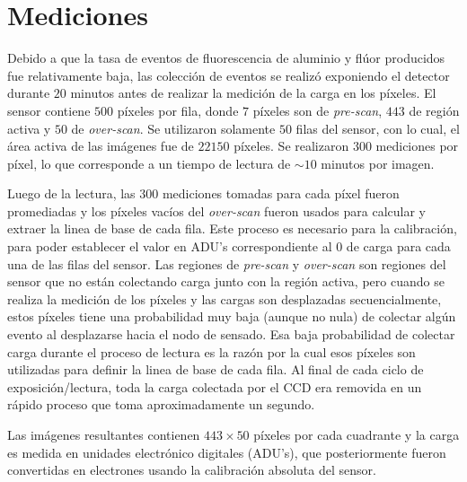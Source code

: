 \section{Mediciones}
\noindent Debido a que la tasa de eventos de fluorescencia de aluminio y flúor producidos fue relativamente baja, las colección de eventos se realizó exponiendo el detector durante $20$ minutos antes de realizar la medición de la carga en los píxeles. El sensor contiene $500$ píxeles por fila, donde $7$ píxeles son de \textit{pre-scan}, $443$ de región activa y $50$ de \textit{over-scan}. Se utilizaron solamente $50$ filas del sensor, con lo cual, el área activa de las imágenes fue de $22150$ píxeles. %
Se realizaron $300$ mediciones por píxel, lo que corresponde a un tiempo de lectura de $\sim 10$ minutos por imagen.

Luego de la lectura, las $300$ mediciones tomadas para cada píxel fueron promediadas y los píxeles vacíos del \textit{over-scan} fueron usados para calcular y extraer la linea de base de cada fila. Este proceso es necesario para la calibración, para poder establecer el valor en ADU's correspondiente al $0$ de carga para cada una de las filas del sensor. Las regiones de \textit{pre-scan} y \textit{over-scan} son regiones del sensor que no están colectando carga junto con la región activa, pero cuando se realiza la medición de los píxeles y las cargas son desplazadas secuencialmente, estos píxeles tiene una probabilidad muy baja (aunque no nula) de colectar algún evento al desplazarse hacia el nodo de sensado. Esa baja probabilidad de colectar carga durante el proceso de lectura es la razón por la cual esos píxeles son utilizadas para definir la linea de base de cada fila. Al final de cada ciclo de exposición/lectura, toda la carga colectada por el CCD era removida en un rápido proceso que toma aproximadamente un segundo.

Las imágenes resultantes contienen $443 \times 50$ píxeles por cada cuadrante y la carga es medida en unidades electrónico digitales (ADU's), que posteriormente fueron convertidas en electrones usando la calibración absoluta del sensor.